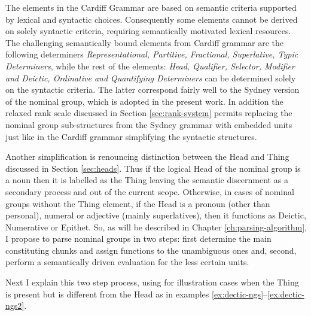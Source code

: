 The elements in the Cardiff Grammar are based on semantic criteria supported by lexical and syntactic choices. Consequently some elements cannot be derived on solely syntactic criteria, requiring semantically motivated lexical resources. The challenging semantically bound elements from Cardiff grammar are the following determiners \textit{Representational, Partitive, Fractional, Superlative, Typic Determiners}, while the rest of the elements: \textit{Head, Qualifier, Selector, Modifier and Deictic, Ordinative and Quantifying Determiners} can be determined solely on the syntactic criteria. The latter correspond fairly well to the Sydney version of the nominal group, which is adopted in the present work. In addition the relaxed rank scale discussed in Section \ref{sec:rank-system} permits replacing the nominal group sub-structures from the Sydney grammar with embedded units just like in the Cardiff grammar simplifying the syntactic structures.
	
	
Another simplification is renouncing distinction between the Head and Thing \citep[390--396]{Halliday2013} discussed in Section \ref{sec:heads}. Thus if the logical Head of the nominal group is a noun then it is labelled as the Thing leaving the semantic discernment as a secondary process and out of the current scope. Otherwise, in cases of nominal groups without the Thing element, if the Head is a pronoun (other than personal), numeral or adjective (mainly superlatives), then it functions as Deictic, Numerative or Epithet. So, as will be described in Chapter \ref{ch:parsing-algorithm}, I propose to parse nominal groups in two steps: first determine the main constituting chunks and assign functions to the unambiguous ones and, second, perform a semantically driven evaluation for the less certain units. 
	
Next I explain this two step process, using for illustration cases when the Thing is present but is different from the Head as in examples \ref{ex:dectic-ngs}--\ref{ex:dectic-ngs2}.

